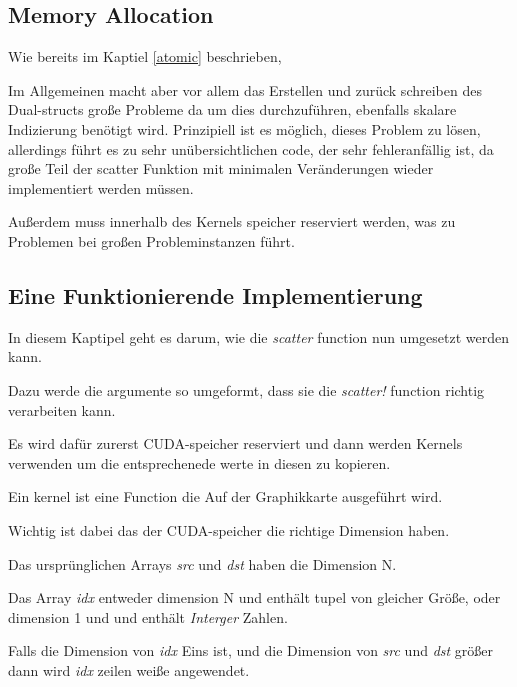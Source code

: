 \subsection{Memory Allocation}

Wie bereits im Kaptiel \ref{atomic} beschrieben, 



Im Allgemeinen macht aber vor allem das Erstellen und zurück schreiben des Dual-structs große Probleme
da um dies durchzuführen, ebenfalls skalare Indizierung benötigt wird.
Prinzipiell ist es möglich, dieses Problem zu lösen, 
allerdings führt es zu sehr unübersichtlichen code, der sehr fehleranfällig ist, 
da große Teil der scatter Funktion mit minimalen Veränderungen wieder implementiert werden müssen.

Außerdem muss innerhalb des Kernels speicher reserviert werden, was zu Problemen bei großen Probleminstanzen führt.

\subsection{Eine Funktionierende Implementierung}

In diesem Kaptipel geht es darum, wie die \textit{scatter} function nun umgesetzt werden kann.

Dazu werde die argumente so umgeformt, 
dass sie die \textit{scatter!} function richtig verarbeiten kann.

Es wird dafür zurerst CUDA-speicher reserviert und dann werden Kernels verwenden um 
die entsprechenede werte in diesen zu kopieren.

Ein kernel ist eine Function die Auf der Graphikkarte ausgeführt wird.

Wichtig ist dabei das der CUDA-speicher die richtige Dimension haben. 

Das ursprünglichen Arrays \textit{src} und \textit{dst} haben die Dimension N.

Das Array \textit{idx} entweder dimension N und enthält tupel von gleicher Größe,
oder dimension 1 und und enthält \textit{Interger} Zahlen.

Falls die Dimension von \textit{idx} Eins ist, und die Dimension von \textit{src}
und \textit{dst} größer dann wird \textit{idx} zeilen weiße angewendet.

